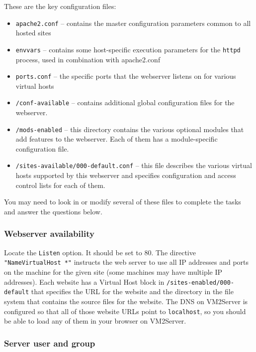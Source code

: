 \documentclass{article}
\begin{document}
These are the key configuration files:
\begin{itemize}
\item {\tt apache2.conf} -- contains the master configuration parameters common to all hosted sites
\item {\tt envvars} -- contains some host-specific execution parameters for the {\tt httpd} process, used in combination with apache2.conf
\item {\tt ports.conf} -- the specific ports that the webserver listens on for various virtual hosts
\item {\tt /conf-available} -- contains additional global configuration files for the webserver.
\item {\tt /mods-enabled} -- this directory contains the various optional modules that add features to the webserver.  Each of them has a module-specific configuration file.
\item {\tt /sites-available/000-default.conf} -- this file describes the various virtual hosts supported by this webserver and specifies configuration and access control lists for each of them.  
\end{itemize}
You may need to look in or modify several of these files to complete the tasks and answer the questions below.  

\subsubsection{Webserver availability}

Locate the {\tt Listen} option.  It should be set to 80.  The directive {\tt "NameVirtualHost *"} instructs the web server to use all IP addresses and ports on the machine for the given site (some machines may have multiple IP addresses).  Each website has a Virtual Host block in {\tt /sites-enabled/000-default} that specifies the URL for the website and the directory in the file system that contains the source files for the website.  The DNS on VM2Server is configured so that all of those website URLs point to {\tt localhost}, so you should be able to load any of them in your browser on VM2Server.  


\subsubsection{Server user and group}
\end{document}
